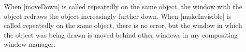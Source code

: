 When \verbatim|moveDown| is called repeatedly on the same object, the window
with the object redraws the object increasingly further down. When
\verbatim|makeInvisible| is called repeatedly on the same object, there
is no error, but the window in which the object was being drawn is moved
behind other windows in my compositing window manager.
